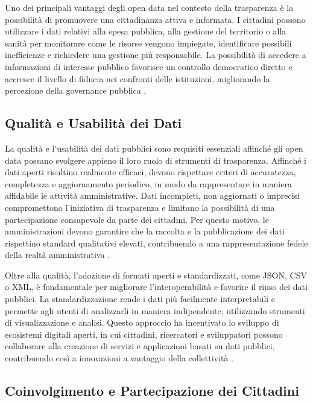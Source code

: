 Uno dei principali vantaggi degli open data nel contesto della trasparenza è la possibilità di promuovere una cittadinanza attiva e informata. I cittadini possono utilizzare i dati relativi alla spesa pubblica, alla gestione del territorio o alla sanità per monitorare come le risorse vengono impiegate, identificare possibili inefficienze e richiedere una gestione più responsabile. La possibilità di accedere a informazioni di interesse pubblico favorisce un controllo democratico diretto e accresce il livello di fiducia nei confronti delle istituzioni, migliorando la percezione della governance pubblica \cite{OECD2020}.

\subsection{Qualità e Usabilità dei Dati}

La qualità e l’usabilità dei dati pubblici sono requisiti essenziali affinché gli open data possano svolgere appieno il loro ruolo di strumenti di trasparenza. Affinché i dati aperti risultino realmente efficaci, devono rispettare criteri di accuratezza, completezza e aggiornamento periodico, in modo da rappresentare in maniera affidabile le attività amministrative. Dati incompleti, non aggiornati o imprecisi compromettono l’iniziativa di trasparenza e limitano la possibilità di una partecipazione consapevole da parte dei cittadini. Per questo motivo, le amministrazioni devono garantire che la raccolta e la pubblicazione dei dati rispettino standard qualitativi elevati, contribuendo a una rappresentazione fedele della realtà amministrativa \cite{Kitchin2014}.

Oltre alla qualità, l’adozione di formati aperti e standardizzati, come JSON, CSV o XML, è fondamentale per migliorare l’interoperabilità e favorire il riuso dei dati pubblici. La standardizzazione rende i dati più facilmente interpretabili e permette agli utenti di analizzarli in maniera indipendente, utilizzando strumenti di visualizzazione e analisi. Questo approccio ha incentivato lo sviluppo di ecosistemi digitali aperti, in cui cittadini, ricercatori e sviluppatori possono collaborare alla creazione di servizi e applicazioni basati su dati pubblici, contribuendo così a innovazioni a vantaggio della collettività \cite{OpenDataHandbook}.

\subsection{Coinvolgimento e Partecipazione dei Cittadini}

